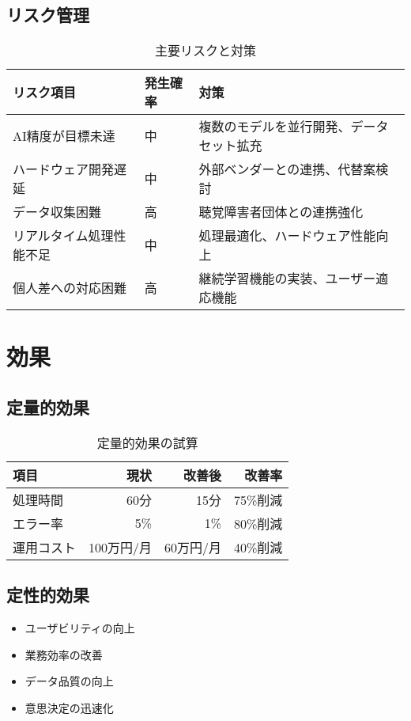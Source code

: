 \documentclass[12pt,a4paper]{jsarticle}
\begin{document}
\subsection{リスク管理}
\begin{table}[h]
\centering
\caption{主要リスクと対策}
\begin{tabular}{|p{4cm}|p{2cm}|p{6cm}|}
\hline
\textbf{リスク項目} & \textbf{発生確率} & \textbf{対策} \\
\hline
AI精度が目標未達 & 中 & 複数のモデルを並行開発、データセット拡充 \\
\hline
ハードウェア開発遅延 & 中 & 外部ベンダーとの連携、代替案検討 \\
\hline
データ収集困難 & 高 & 聴覚障害者団体との連携強化 \\
\hline
リアルタイム処理性能不足 & 中 & 処理最適化、ハードウェア性能向上 \\
\hline
個人差への対応困難 & 高 & 継続学習機能の実装、ユーザー適応機能 \\
\hline
\end{tabular}
\end{table}
\section{効果}

\subsection{定量的効果}
\begin{table}[h]
\centering
\caption{定量的効果の試算}
\begin{tabular}{|l|r|r|r|}
\hline
\textbf{項目} & \textbf{現状} & \textbf{改善後} & \textbf{改善率} \\
\hline
処理時間 & 60分 & 15分 & 75\%削減 \\
\hline
エラー率 & 5\% & 1\% & 80\%削減 \\
\hline
運用コスト & 100万円/月 & 60万円/月 & 40\%削減 \\
\hline
\end{tabular}
\end{table}

\subsection{定性的効果}
\begin{itemize}
    \item ユーザビリティの向上
    \item 業務効率の改善
    \item データ品質の向上
    \item 意思決定の迅速化
\end{itemize}
\end{document}
